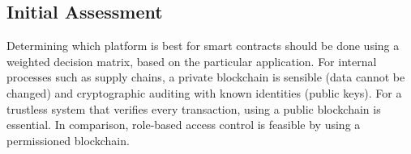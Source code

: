 \newpage 
\subsection{Initial Assessment}



Determining which platform is best for smart contracts should be done using a weighted decision matrix, based on the particular application. For internal processes such as supply chains, a private \gls{blockchain} is sensible (data cannot be changed) and cryptographic auditing with known identities (public keys). For a trustless system that verifies every transaction, using a public blockchain is essential. In comparison, role-based access control is feasible by using a permissioned blockchain. \hfill \break


